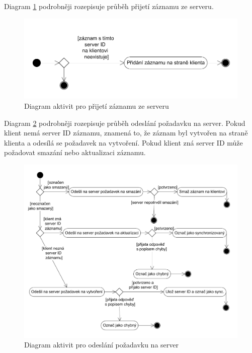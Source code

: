 \documentclass{diplomka}
\begin{document}
Diagram \ref{fig:syncdown} podrobněji rozepisuje průběh přijetí záznamu ze serveru.
\begin{figure}[H]
  \centering
  \includegraphics[scale=0.7]{visio/syncdown.pdf}
\caption{Diagram aktivit pro přijetí záznamu ze serveru}
\label{fig:syncdown}
\end{figure}

Diagram \ref{fig:syncup} podrobněji rozepisuje průběh odeslání požadavku na server. Pokud klient nemá server ID záznamu, znamená to, že záznam byl vytvořen na straně klienta a odesílá se požadavek na vytvoření. Pokud klient zná server ID může požadovat smazání nebo aktualizaci záznamu. 



\begin{figure}[H]
  \centering
  \includegraphics[scale=0.7]{visio/syncup.pdf}
\caption{Diagram aktivit pro odeslání požadavku na server}
\label{fig:syncup}
\end{figure}
\vspace{-8mm}
\end{document}
